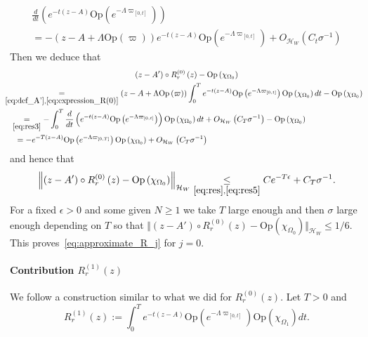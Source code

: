 \documentclass[AHL,Unicode,longabstracts,published]{cedram}
\newcommand{\clH}{\mathcal{H}}
\newcommand{\Opp}{\mathrm{Op}}
\newcommand{\clH}{\mathcal{H}}
\begin{document}
\begin{multline}\label{eq:res3}
\frac{d}{dt}\left(e^{-t\left(z-A\right)}\Opp \left(e^{-\Lambda\varpi_{\left[0,t\right]}}\right)\right)\\
= -\left(z-A+\Lambda\Opp \left(\varpi\right)\right)e^{-t\left(z-A\right)}\Opp \left(e^{-\Lambda\varpi_{\left[0,t\right]}}\right)
+O_{\clH _{W}}\left(C_{t}\sigma^{-1}\right)
\end{multline}
Then we deduce that
\begin{multline}\label{eq:res}
\left(z-A'\right)\circ R_{r}^{\left(0\right)}\left(z\right)-\Opp \left(\chi_{\Omega_{0}}\right)\\
\begin{aligned}
&\mkern-17mu\underset{\eqref{eq:def_A'},\eqref{eq:expression_R(0)}}{=}\left(z-A+\Lambda\Opp \left(\varpi\right)\right)\int_{0}^{T}e^{-t\left(z-A\right)}\Opp \left(e^{-\Lambda\varpi_{\left[0,t\right]}}\right)\Opp \left(\chi_{\Omega_{0}}\right)dt-\Opp \left(\chi_{\Omega_{0}}\right)\\
& \underset{\eqref{eq:res3}}{=}-\int_{0}^{T}\frac{d}{dt}\left(e^{-t\left(z-A\right)}\Opp \left(e^{-\Lambda\varpi_{\left[0,t\right]}}\right)\right)\Opp \left(\chi_{\Omega_{0}}\right)dt+O_{\clH _{W}}\left(C_{T}\sigma^{-1}\right)-\Opp \left(\chi_{\Omega_{0}}\right)\\
& \mkern10mu =-e^{-T\left(z-A\right)}\Opp \left(e^{-\Lambda\varpi_{\left[0,T\right]}}\right)\Opp \left(\chi_{\Omega_{0}}\right)+O_{\clH _{W}}\left(C_{T}\sigma^{-1}\right)
\end{aligned}
\end{multline}
and hence that
\[
\left\Vert \left(z-A'\right)\circ R_{r}^{\left(0\right)}\left(z\right)-\Opp \left(\chi_{\Omega_{0}}\right)\right\Vert _{\clH _{W}}\underset{\eqref{eq:res},\eqref{eq:res5}}{\leq}Ce^{-T\epsilon}+C_{T}\sigma^{-1}.
\]
For a fixed $\epsilon>0$ and some given $N\geq1$ we take $T$ large enough and then $\sigma$ large enough depending on $T$ so that $\Vert (z-A')\circ R_{r}^{(0)}(z)-\Opp (\chi_{\Omega_{0}})\Vert _{\clH _{W}}\leq1/6$. This proves~\eqref{eq:approximate_R_j} for $j=0$.

\paragraph{Contribution $R_{r}^{(1)}(z)$}

We follow a construction similar to what we did for $R_{r}^{(0)}(z)$. Let $T>0$ and
\begin{equation}\label{eq:expression_R(1)}
R_{r}^{\left(1\right)}\left(z\right):=\int_{0}^{T}e^{-t\left(z-A\right)}\Opp \left(e^{-\Lambda\varpi_{\left[0,t\right]}}\right)\Opp \left(\chi_{\Omega_{1}}\right)dt.
\end{equation}
\end{document}
